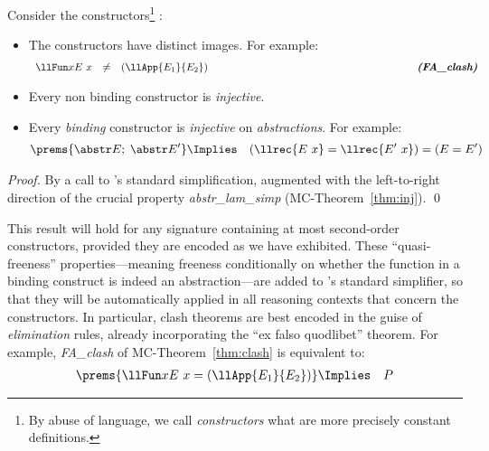 \documentclass[final]{svjour3}
\begin{document}
\begin{goal} \mbox{}
  Consider the constructors\footnote{By abuse of language, we call
    \emph{constructors} what are more precisely \HOL constant
    definitions.}  :
  \begin{itemize}


  \item The constructors have distinct images. For example:
\[
    \begin{array}{lcr}
      \llFun x {E\ x}  &\not= &(\llApp{E_1}{E_2})
\qquad\qquad\qquad\qquad\qquad\qquad\qquad\qquad\qquad\qquad
\mbox{\textbf{\emph{(FA\_clash)}}}
    \end{array}
\]
  \item Every non {binding} constructor is \emph{injective}.
  \item Every \emph{binding} constructor is \emph{injective} on
    \emph{abstractions}.  For example:
  \begin{eqnarray*}
\prems{\abstr E;\; \abstr E'} &\Implies &(\llrec{E\ x} = \llrec{E'\ 
    x}) = (E = E')  \end{eqnarray*}
  \end{itemize}
\label{thm:clash}
\end{goal}

\begin{proof}
  By a call to \HOL's standard simplification, augmented with the left-to-right
  direction of the crucial property \textit{abstr\_lam\_simp}
  (MC-Theorem~\ref{thm:inj}).
\qed
\end{proof}

This result will hold for any signature containing at most
second-order constructors, provided they are encoded as we have
exhibited.
These ``quasi-freeness'' properties---meaning freeness conditionally
on whether the function in a binding construct is indeed an
abstraction---are added to \HOL's standard simplifier, so that they
will be automatically applied in all reasoning contexts that concern
the constructors. In particular, clash theorems are best encoded in the guise of
\emph{elimination} rules, already incorporating the ``ex falso
quodlibet'' theorem. For example, \textit{FA\_clash}
of MC-Theorem~\ref{thm:clash} is equivalent to:
\begin{eqnarray*}
     \prems{\llFun x {E\ x} = (\llApp{E_1}{E_2})} &\Implies& P
\end{eqnarray*}
\end{document}
